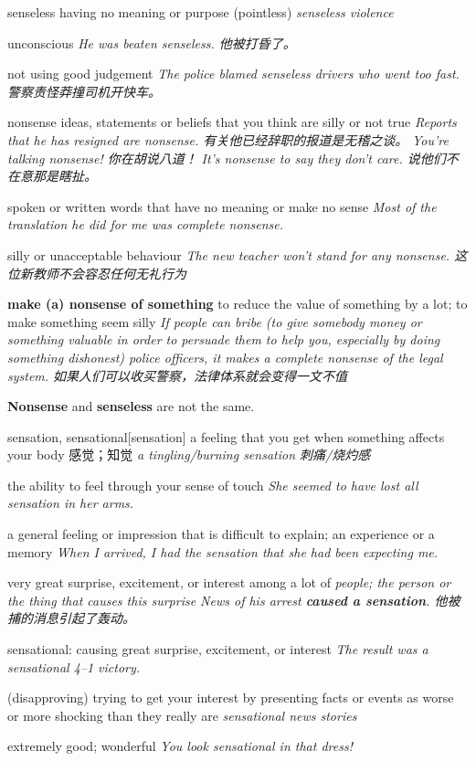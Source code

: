 \begin{DefWord}{senseless}
    having no meaning or purpose (pointless)
    \textit{senseless violence}

    unconscious
    \textit{He was beaten senseless. 他被打昏了。}

    not using good judgement
    \textit{The police blamed senseless drivers who went too fast. 警察责怪莽撞司机开快车。}
\end{DefWord}

\begin{DefWord}{nonsense}
    ideas, statements or beliefs that you think are silly or not true
    \textit{Reports that he has resigned are nonsense. 有关他已经辞职的报道是无稽之谈。}
    \textit{You're talking nonsense! 你在胡说八道！}
    \textit{It's nonsense to say they don't care. 说他们不在意那是瞎扯。}

    spoken or written words that have no meaning or make no sense
    \textit{Most of the translation he did for me was complete nonsense.}

    silly or unacceptable behaviour
    \textit{The new teacher won't stand for any nonsense. 这位新教师不会容忍任何无礼行为}

    \textbf{make (a) nonsense of something}
    to reduce the value of something by a lot; to make something seem silly
    \textit{If people can bribe (to give somebody money or something valuable in order to persuade them to help you, especially by doing something dishonest) police officers, it makes a complete nonsense of the legal system. 如果人们可以收买警察，法律体系就会变得一文不值}
\end{DefWord}

\begin{remark}
    \textbf{Nonsense} and \textbf{senseless} are not the same.
\end{remark}

\begin{DefWord}{sensation, sensational}[sensation]
    a feeling that you get when something affects your body 感觉；知觉
    \textit{a tingling/burning sensation 刺痛/烧灼感}

    the ability to feel through your sense of touch
    \textit{She seemed to have lost all sensation in her arms.}

    a general feeling or impression that is difficult to explain; an experience or a memory
    \textit{When I arrived, I had the sensation that she had been expecting me.}

    very great surprise, excitement, or interest among a lot of \textit{people; the person or the thing that causes this surprise
    News of his arrest \textbf{caused a sensation}. 他被捕的消息引起了轰动。}

    sensational: causing great surprise, excitement, or interest
    \textit{The result was a sensational 4–1 victory.}

    (disapproving) trying to get your interest by presenting facts or events as worse or more shocking than they really are
    \textit{sensational news stories}

    extremely good; wonderful
    \textit{You look sensational in that dress!}
\end{DefWord}

